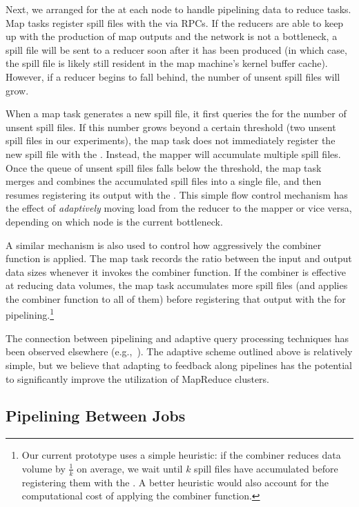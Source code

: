 Next, we arranged for the {\TT} at each node to handle pipelining data to reduce
tasks. Map tasks register spill files with the {\TT} via RPCs. If the reducers
are able to keep up with the production of map outputs and the network is not a
bottleneck, a spill file will be sent to a reducer soon after it has been
produced (in which case, the spill file is likely still resident in the map
machine's kernel buffer cache). However, if a reducer begins to fall behind, the
number of unsent spill files will grow.

When a map task generates a new spill file, it first queries the {\TT} for the
number of unsent spill files. If this number grows beyond a certain threshold
(two unsent spill files in our experiments), the map task does not immediately
register the new spill file with the {\TT}. Instead, the mapper will accumulate
multiple spill files. Once the queue of unsent spill files falls below the
threshold, the map task merges and combines the accumulated spill files into a
single file, and then resumes registering its output with the {\TT}. This simple
flow control mechanism has the effect of \emph{adaptively} moving load from the
reducer to the mapper or vice versa, depending on which node is the current
bottleneck.

A similar mechanism is also used to control how aggressively the combiner
function is applied. The map task records the ratio between the input and output
data sizes whenever it invokes the combiner function. If the combiner is
effective at reducing data volumes, the map task accumulates more spill files
(and applies the combiner function to all of them) before registering that
output with the {\TT} for pipelining.\footnote{Our current prototype uses a
  simple heuristic: if the combiner reduces data volume by $\frac{1}{k}$ on
  average, we wait until $k$ spill files have accumulated before registering
  them with the {\TT}. A better heuristic would also account for the computational
  cost of applying the combiner function.}

The connection between pipelining and adaptive query processing techniques has
been observed elsewhere (e.g.,~\cite{eddies}). The adaptive scheme outlined
above is relatively simple, but we believe that adapting to feedback along
pipelines has the potential to significantly improve the utilization of
MapReduce clusters.

\subsection{Pipelining Between Jobs}
\label{ch:hop:sec:inter-pipe}

